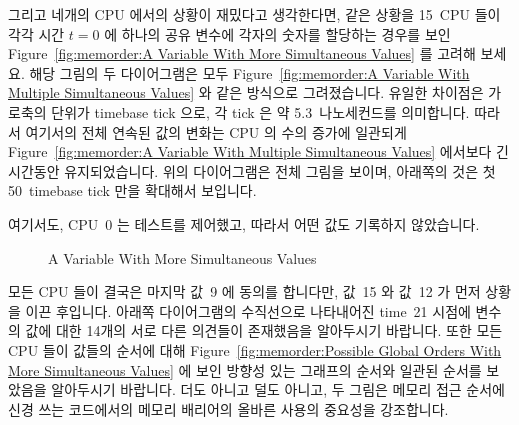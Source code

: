 그리고 네개의 CPU 에서의 상황이 재밌다고 생각한다면, 같은 상황을 15~CPU 들이
각각 시간 $t=0$ 에 하나의 공유 변수에 각자의 숫자를 할당하는 경우를 보인
Figure~\ref{fig:memorder:A Variable With More Simultaneous Values} 를 고려해
보세요.
해당 그림의 두 다이어그램은 모두
Figure~\ref{fig:memorder:A Variable With Multiple Simultaneous Values} 와 같은
방식으로 그려졌습니다.
유일한 차이점은 가로축의 단위가 timebase tick 으로, 각 tick 은 약
5.3~나노세컨드를 의미합니다.
따라서 여기서의 전체 연속된 값의 변화는 CPU 의 수의 증가에 일관되게
Figure~\ref{fig:memorder:A Variable With Multiple Simultaneous Values} 에서보다
긴 시간동안 유지되었습니다.
위의 다이어그램은 전체 그림을 보이며, 아래쪽의 것은 첫 50~timebase tick 만을
확대해서 보입니다.

여기서도, CPU~0 는 테스트를 제어했고, 따라서 어떤 값도 기록하지 않았습니다.

\begin{figure}
\centering
{}
\caption{A Variable With More Simultaneous Values}
\end{figure}

모든 CPU 들이 결국은 마지막 값~9 에 동의를 합니다만, 값~15 와 값~12 가 먼저
상황을 이끈 후입니다.
아래쪽 다이어그램의 수직선으로 나타내어진 time~21 시점에 변수의 값에 대한
14개의 서로 다른 의견들이 존재했음을 알아두시기 바랍니다.
또한 모든 CPU 들이 값들의 순서에 대해
Figure~\ref{fig:memorder:Possible Global Orders With More Simultaneous Values}
에 보인 방향성 있는 그래프의 순서와 일관된 순서를 보았음을 알아두시기 바랍니다.
더도 아니고 덜도 아니고, 두 그림은 메모리 접근 순서에 신경 쓰는 코드에서의
메모리 배리어의 올바른 사용의 중요성을 강조합니다.
\iffalse

